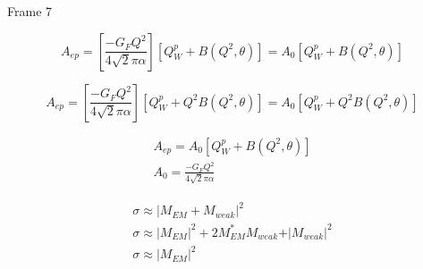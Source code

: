 \documentclass[xcolor=x11names,compress,8pt]{beamer}
\renewcommand{\(}{\begin{columns}}
\renewcommand{\)}{\end{columns}}
\newcommand{\<}[1]{\begin{column}{#1}}
\renewcommand{\>}{\end{column}}
\begin{document}
\begin{frame}{Frame 7}

\begin{equation} \label{equ:qweak3}
A_{ep} = \left[ \frac{-G_{F}Q^{2}}{4 \sqrt{2}\pi\alpha} \right] \left[ Q_{W}^{p} + B(Q^{2}, \theta) \right] = A_{0} \left[ Q_{W}^{p} + B(Q^{2}, \theta) \right]
\end{equation}

\begin{equation} \label{equ:qweak5}
A_{ep} = \left[ \frac{-G_{F}Q^{2}}{4 \sqrt{2}\pi\alpha} \right] \left[ Q_{W}^{p} + Q^{2}B(Q^{2}, \theta) \right] = A_{0} \left[ Q_{W}^{p} + Q^{2}B(Q^{2}, \theta) \right]
\end{equation}

\begin{equation} \label{equ:qweak4}
\begin{split}
A_{ep} = A_{0} \left[ Q_{W}^{p} + B(Q^{2}, \theta) \right]\\
A_{0} = \frac{-G_{F}Q^{2}}{4 \sqrt{2}\pi\alpha}
\end{split}
\end{equation}


\begin{equation} \label{equ:qweak6}
\begin{split}
\sigma \approx \vert M_{EM} + M_{weak} \vert^{2} \\
\sigma \approx \vert M_{EM} \vert^{2} + 2M_{EM}^{*}M_{weak} + \vert M_{weak} \vert^{2}  \\
\sigma \approx \vert M_{EM} \vert^{2} 
\end{split}
\end{equation}

\end{frame}

\end{document}
